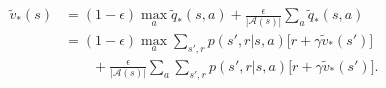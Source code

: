 \begin{align*}
\tilde{v}_\ast(s) &= (1-\epsilon)\max_a \tilde{q}_\ast(s,a) + \frac{\epsilon}{|\mathcal{A}(s)|} \sum_a \tilde{q}_\ast(s,a) \\
 &= (1-\epsilon)\max_a \sum_{s',r} p(s',r|s,a) \Big[r+\gamma\tilde{v}_\ast(s')\Big] \\
 &\qquad + \frac{\epsilon}{|\mathcal{A}(s)|} \sum_a \sum_{s',r} p(s',r|s,a) \Big[r+\gamma\tilde{v}_\ast(s')\Big].
\end{align*}


